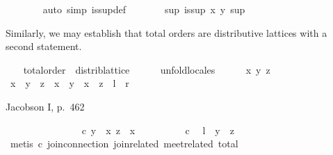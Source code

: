 \begin{isabellebody}
\ \ \ \ \ \ \isamarkupfalse%
\ {\isacharparenleft}auto\ simp{\isacharcolon}\ is{\isacharunderscore}sup{\isacharunderscore}def{\isacharparenright}\isanewline
\ \ \ \ \isamarkupfalse%
\ \isamarkupfalse%
\ {\isachardoublequoteopen}{\isasymexists}sup{\isachardot}\ is{\isacharunderscore}sup\ x\ y\ sup{\isachardoublequoteclose}\ \isacommand{{\isachardot}{\isachardot}}\isamarkupfalse%
%
\endisataginvisible
{\isafoldinvisible}%
%
\isadeliminvisible
%
\endisadeliminvisible
%
\isadelimvisible
\ %
\endisadelimvisible
%
\isatagvisible
{}\isamarkupfalse%
%
\endisatagvisible
{\isafoldvisible}%
%
\isadelimvisible
%
\endisadelimvisible
%
\begin{isamarkuptext}%
Similarly, we may establish that total orders are distributive
  lattices with a second  statement.%
\end{isamarkuptext}%
\isamarkuptrue%
\ \ \isamarkupfalse%
\ total{\isacharunderscore}order\ {\isasymsubseteq}\ distrib{\isacharunderscore}lattice\isanewline
%
\isadelimproof
\ \ \ \ %
\endisadelimproof
%
\isatagproof
{}\isamarkupfalse%
\ unfold{\isacharunderscore}locales\isanewline
\ \ \ \ \isamarkupfalse%
\ x\ y\ z\isanewline
\ \ \ \ \isamarkupfalse%
\ {\isachardoublequoteopen}x\ {\isasymsqinter}\ {\isacharparenleft}y\ {\isasymsqunion}\ z{\isacharparenright}\ {\isacharequal}\ x\ {\isasymsqinter}\ y\ {\isasymsqunion}\ x\ {\isasymsqinter}\ z{\isachardoublequoteclose}\ {\isacharparenleft}\ {\isachardoublequoteopen}{\isacharquery}l\ {\isacharequal}\ {\isacharquery}r{\isachardoublequoteclose}{\isacharparenright}%
\begin{isamarkuptxt}%
Jacobson I, p.\ 462%
\end{isamarkuptxt}%
\isamarkuptrue%
\ \ \ \ \isamarkupfalse%
\ {\isacharminus}\isanewline
\ \ \ \ \ \ \isacommand{{\isacharbraceleft}}\isamarkupfalse%
\ \isamarkupfalse%
\ c{\isacharcolon}\ {\isachardoublequoteopen}y\ {\isasymsqsubseteq}\ x{\isachardoublequoteclose}\ {\isachardoublequoteopen}z\ {\isasymsqsubseteq}\ x{\isachardoublequoteclose}\isanewline
\ \ \ \ \ \ \ \ \isamarkupfalse%
\ c\ \isamarkupfalse%
\ {\isachardoublequoteopen}{\isacharquery}l\ {\isacharequal}\ y\ {\isasymsqunion}\ z{\isachardoublequoteclose}\isanewline
\ \ \ \ \ \ \ \ \ \ \isamarkupfalse%
\ {\isacharparenleft}metis\ c\ join{\isacharunderscore}connection{}\ join{\isacharunderscore}related{}\ meet{\isacharunderscore}related{}\ total{\isacharparenright}\isanewline

\end{isabellebody}
